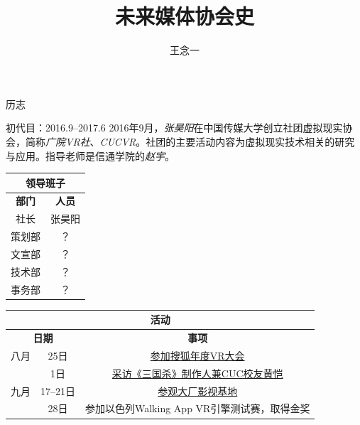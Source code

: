 \documentclass{paper}
\newcommand{\name}[1]{{\em #1}}
\renewcommand{\thead}[1]{\textbf{ #1}}
\begin{document}
\setlength{\droptitle}{-.5in}
\setlength{\parindent}{0pt}
\setlength{\parskip}{4pt}

\title{未来媒体协会史}
\author{王念一}
\maketitle

\tableofcontents

\newpage
\begin{section}{历志}
	\begin{subsection}{初代目：2016.9--2017.6}
		2016年9月，\name{张昊阳}在中国传媒大学创立社团虚拟现实协会，简称\name{广院VR社}、\name{CUCVR}。社团的主要活动内容为虚拟现实技术相关的研究与应用。指导老师是信通学院的\name{赵宇}。

		\begin{table}[H]\begin{center}
			\begin{tabular}{|c|c|}
				\hline
				\multicolumn{2}{|c|}{\thead{领导班子}} \\ \hline
				\thead{部门} & \thead{人员} \\ \hline
				社长 & 张昊阳 \\ \hline
				策划部 & ？ \\ \hline
				文宣部 & ？ \\ \hline
				技术部 & ？ \\ \hline
				事务部 & ？ \\ \hline
			\end{tabular}
		\end{center}\end{table}

		\begin{table}[H]\begin{center}
			\begin{tabular}{|c|c|c|}
				\hline
				\multicolumn{3}{|c|}{\thead{活动}} \\ \hline
				\multicolumn{2}{|c|}{\thead{日期}} & \thead{事项} \\ \hline

				\multirow{1}{*}{八月}
				& 25日 & \href{https://mp.weixin.qq.com/s/uu4QynWSQL0nTetRwK7Nng}{参加搜狐年度VR大会} \\ \hline

				\multirow{3}{*}{九月}
				& 1日 & \href{https://mp.weixin.qq.com/s/WgZMbZU0vUXvtqOGVd6B_A}{采访《三国杀》制作人兼CUC校友黄恺} \\
				& 17--21日 & \href{https://mp.weixin.qq.com/s/sXsqLPwm6NPsbOR82Dsdlw}{参观大厂影视基地} \\
				& 28日 & 参加以色列Walking App VR引擎测试赛，取得金奖 \\ \hline


\end{tabular}
\end{center}
\end{table}
\end{subsection}
\end{section}
\end{document}
